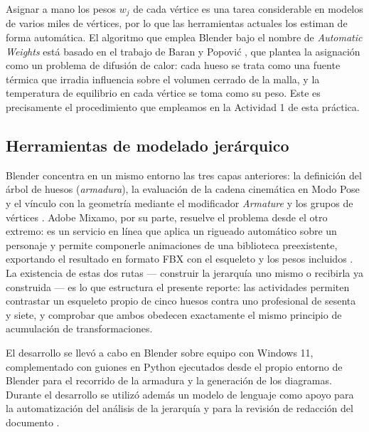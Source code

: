 Asignar a mano los pesos $w_j$ de cada vértice es una tarea considerable en modelos de varios miles de vértices, por lo que las herramientas actuales los estiman de forma automática. El algoritmo que emplea Blender bajo el nombre de \textit{Automatic Weights} está basado en el trabajo de Baran y Popović \cite{baran2007}, que plantea la asignación como un problema de difusión de calor: cada hueso se trata como una fuente térmica que irradia influencia sobre el volumen cerrado de la malla, y la temperatura de equilibrio en cada vértice se toma como su peso. Este es precisamente el procedimiento que empleamos en la Actividad 1 de esta práctica.

\subsection{Herramientas de modelado jerárquico}

Blender concentra en un mismo entorno las tres capas anteriores: la definición del árbol de huesos (\textit{armadura}), la evaluación de la cadena cinemática en Modo Pose y el vínculo con la geometría mediante el modificador \textit{Armature} y los grupos de vértices \cite{blender_manual}. Adobe Mixamo, por su parte, resuelve el problema desde el otro extremo: es un servicio en línea que aplica un rigueado automático sobre un personaje y permite componerle animaciones de una biblioteca preexistente, exportando el resultado en formato FBX con el esqueleto y los pesos incluidos \cite{mixamo}. La existencia de estas dos rutas --- construir la jerarquía uno mismo o recibirla ya construida --- es lo que estructura el presente reporte: las actividades permiten contrastar un esqueleto propio de cinco huesos contra uno profesional de sesenta y siete, y comprobar que ambos obedecen exactamente el mismo principio de acumulación de transformaciones.

El desarrollo se llevó a cabo en Blender sobre equipo con Windows 11, complementado con guiones en Python ejecutados desde el propio entorno de Blender para el recorrido de la armadura y la generación de los diagramas. Durante el desarrollo se utilizó además un modelo de lenguaje como apoyo para la automatización del análisis de la jerarquía y para la revisión de redacción del documento \cite{anthropic2026}.
